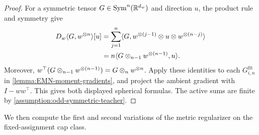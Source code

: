\begin{proof}
For a symmetric tensor $G\in\mathrm{Sym}^n(\mathbb R^{d_w})$ and direction $u$,
the product rule and symmetry give
\[
\begin{aligned}
 D_w\langle G,w^{\otimes n}\rangle[u]
 &=\sum_{j=1}^n
 \langle G,w^{\otimes(j-1)}\otimes u\otimes w^{\otimes(n-j)}\rangle\\
 &=n\langle G\otimes_{n-1}w^{\otimes(n-1)},u\rangle.
\end{aligned}
\]
Moreover,
$w^\top(G\otimes_{n-1}w^{\otimes(n-1)})=G\otimes_{n}w^{\otimes n}$.
Apply these identities to each $G_{i,n}^{\mathrm{fit}}$ in
\cref{lemma:EMN-moment-gradients}, and project the ambient gradient
with $I-ww^\top$. This gives both displayed spherical formulas.
The active sums are finite by \cref{assumption:odd-symmetric-teacher}.
\end{proof}

We then compute the first and second variations of the metric regularizer on the fixed-assignment cap class.

